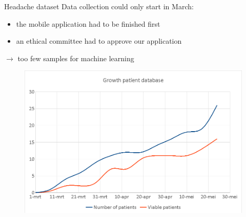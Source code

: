 \documentclass[english]{beamer}
\begin{document}
\begin{frame}{Headache dataset}
	Data collection could only start in March: \\
	\begin{itemize}
		\item the mobile application had to be finished first
		\item an ethical committee had to approve our application
	\end{itemize} \vspace{2em}
	$\rightarrow$ too few samples for machine learning
\end{frame}

\begin{frame}
	\begin{figure}
		\centering
			\includegraphics[width=\textwidth]{figures/chart_patients.png}
	\end{figure}

\end{frame}
\end{document}
